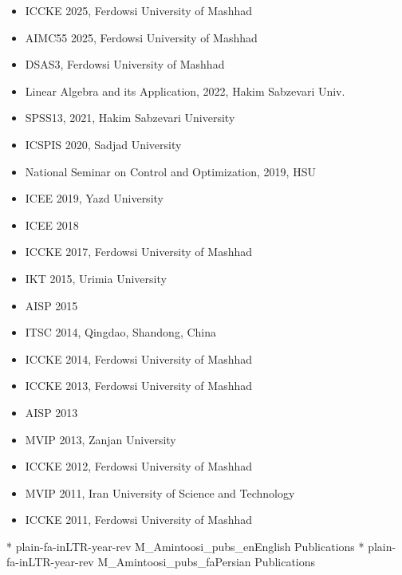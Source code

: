 \documentclass[10pt,a4paper]{moderncv}
\begin{document}
\begin{itemize}
\item ICCKE 2025, Ferdowsi University of Mashhad
\item AIMC55 2025, Ferdowsi University of Mashhad
\item DSAS3, Ferdowsi University of Mashhad
\item Linear Algebra and its Application, 2022, Hakim Sabzevari Univ.
\item SPSS13, 2021, Hakim Sabzevari University
\item ICSPIS 2020, Sadjad University
\item National Seminar on Control and Optimization, 2019, HSU
\item ICEE 2019, Yazd University
\item ICEE 2018
\item ICCKE 2017, Ferdowsi University of Mashhad
\item IKT 2015, Urimia University
\item AISP 2015
\item ITSC 2014, Qingdao, Shandong, China
\item ICCKE 2014, Ferdowsi University of Mashhad
\item ICCKE 2013, Ferdowsi University of Mashhad
\item AISP 2013
\item MVIP 2013, Zanjan University
\item ICCKE 2012, Ferdowsi University of Mashhad
\item MVIP 2011, Iran University of Science and Technology
\item ICCKE 2011, Ferdowsi University of Mashhad
\end{itemize}







\nocite{pubEn}{*}
{plain-fa-inLTR-year-rev}
{M_Amintoosi_pubs_en}{English Publications}
\nocite{pubFa}{*}
{plain-fa-inLTR-year-rev}
{M_Amintoosi_pubs_fa}{Persian Publications}

%
%

%
%
%
\end{document}
